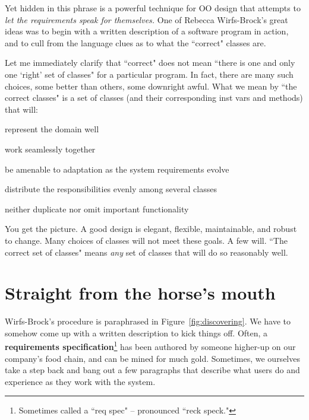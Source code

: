 Yet hidden in this phrase is a powerful technique for OO design that attempts
to \textit{let the requirements speak for themselves.} One of Rebecca
Wirfs-Brock's great ideas was to begin with a written description of a
software program in action, and to cull from the language clues as to what the
``correct" classes are.

Let me immediately clarify that ``correct" does not mean ``there is one and
only one `right' set of classes" for a particular program. In fact, there are
many such choices, some better than others, some downright awful. What we
mean by ``the correct classes" is a set of classes (and their corresponding
inst vars and methods) that will:

\begin{compactitem}
\item represent the domain well
\item work seamlessly together
\item be amenable to adaptation as the system requirements evolve
\item distribute the responsibilities evenly among several classes
\item neither duplicate nor omit important functionality
\end{compactitem}

You get the picture. A good design is elegant, flexible, maintainable, and
robust to change. Many choices of classes will not meet these goals. A few
will. ``The correct set of classes" means \textit{any} set of classes that
will do so reasonably well.

\section{Straight from the horse's mouth}

Wirfs-Brock's procedure is paraphrased in Figure~\ref{fig:discovering}. We
have to somehow come up with a written description to kick things off. Often,
a \textbf{requirements specification}\footnote{Sometimes called a ``req spec"
-- pronounced ``reck speck."} has been authored by someone higher-up on our
company's food chain, and can be mined for much gold. Sometimes, we ourselves
take a step back and bang out a few paragraphs that describe what users do and
experience as they work with the system.

